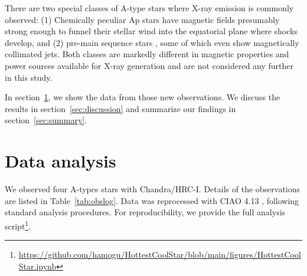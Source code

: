 \documentclass[preprint2]{aastex631}
\begin{document}
There are two special classes of A-type stars where X-ray emission is commonly observed: (1) Chemically peculiar Ap \citep{1997A&A...323..121B,2011A&A...531A..58R} stars have magnetic fields presumably strong enough to funnel their stellar wind into the equatorial plane where shocks develop, and (2) pre-main sequence stars \citep[Herbig Ae stars, e.g.][]{2004ApJ...614..221S,2020ApJ...888...15S,2007A&A...468..541T,2009A&A...494.1041G}, some of which even show magnetically collimated jets. Both classes are markedly different in magnetic properties and power sources available for X-ray generation and are not considered any further in this study.

In section~\ref{sec:data}, we show the data from those new observations. We discuss the results in section~\ref{sec:discussion} and summarize our findings in section~\ref{sec:summary}.


\section{Data analysis} \label{sec:data}
We observed four A-types stars with Chandra/HRC-I. Details of the observations are listed in Table~\ref{tab:obslog}. Data was reprocessed with CIAO 4.13 \citep{2006SPIE.6270E..1VF}, following standard analysis procedures.
For reproducibility, we provide the full analysis script\footnote{\url{https://github.com/hamogu/HottestCoolStar/blob/main/figures/HottestCoolStar.ipynb}}.
\end{document}
